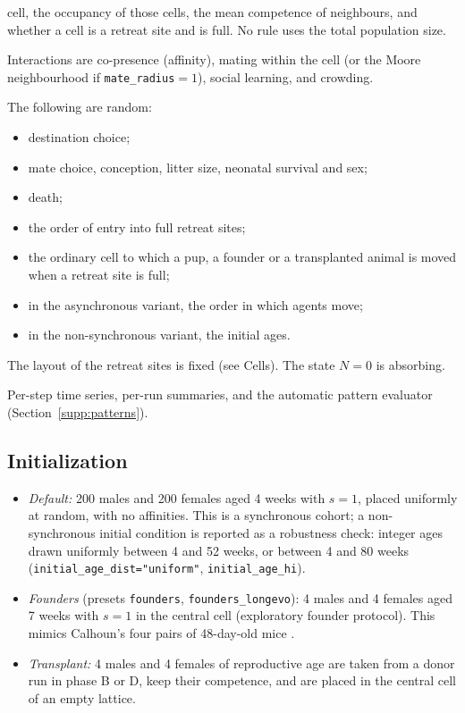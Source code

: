 \documentclass[preprint,12pt,authoryear]{elsarticle}
\begin{document}
\begin{description}
  cell, the occupancy of those cells, the mean competence of neighbours, and whether a cell is a retreat site and is
  full. No rule uses the total population size.
\item[Interaction.] Interactions are co-presence (affinity), mating within the cell (or the Moore neighbourhood if
  \texttt{mate\_radius}${}=1$), social learning, and crowding.
\item[Stochasticity.] The following are random:
  \begin{itemize}
  \item destination choice;
  \item mate choice, conception, litter size, neonatal survival and sex;
  \item death;
  \item the order of entry into full retreat sites;
  \item the ordinary cell to which a pup, a founder or a transplanted animal is moved when a retreat site is full;
  \item in the asynchronous variant, the order in which agents move;
  \item in the non-synchronous variant, the initial ages.
  \end{itemize}
  The layout of the retreat sites is fixed (see Cells).
  The state $N=0$ is absorbing.
\item[Observation.] Per-step time series, per-run summaries, and the automatic pattern evaluator
  (Section~\ref{supp:patterns}).
\end{description}

\subsection*{Initialization}
\begin{itemize}
\item \emph{Default:} 200 males and 200 females aged 4 weeks with $s=1$, placed uniformly at random, with no
  affinities. This is a synchronous cohort; a non-synchronous initial condition is reported as a robustness
  check: integer ages drawn uniformly between 4 and 52 weeks, or between 4 and 80 weeks
  (\texttt{initial\_age\_dist="uniform"}, \texttt{initial\_age\_hi}).
\item \emph{Founders} (presets \texttt{founders}, \texttt{founders\_longevo}): 4 males and 4 females aged 7 weeks with
  $s=1$ in the central cell (exploratory founder protocol). This mimics Calhoun's four pairs of 48-day-old mice \citep{Calhoun1973}.
\item \emph{Transplant:} 4 males and 4 females of reproductive age are taken from a donor run in phase B or D, keep
  their competence, and are placed in the central cell of an empty lattice.
\end{itemize}
\end{document}
